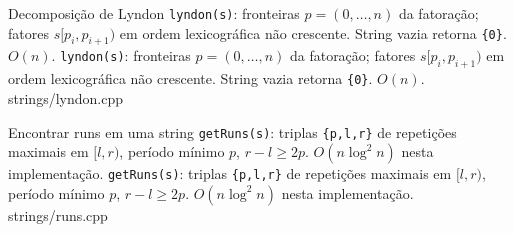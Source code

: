 \templateentry
{Decomposição de Lyndon}
{\texttt{lyndon(s)}: fronteiras $p=(0,\ldots,n)$ da fatoração; fatores $s[p_i,p_{i+1})$ em ordem lexicográfica não crescente. String vazia retorna \texttt{\{0\}}. $O(n)$.}
{\texttt{lyndon(s)}: fronteiras $p=(0,\ldots,n)$ da fatoração; fatores $s[p_i,p_{i+1})$ em ordem lexicográfica não crescente. String vazia retorna \texttt{\{0\}}. $O(n)$.}
{strings/lyndon.cpp}

\templateentry
{Encontrar runs em uma string}
{\texttt{getRuns(s)}: triplas \texttt{\{p,l,r\}} de repetições maximais em $[l,r)$, período mínimo $p$, $r-l\ge2p$. $O(n\log^2 n)$ nesta implementação.}
{\texttt{getRuns(s)}: triplas \texttt{\{p,l,r\}} de repetições maximais em $[l,r)$, período mínimo $p$, $r-l\ge2p$. $O(n\log^2 n)$ nesta implementação.}
{strings/runs.cpp}
